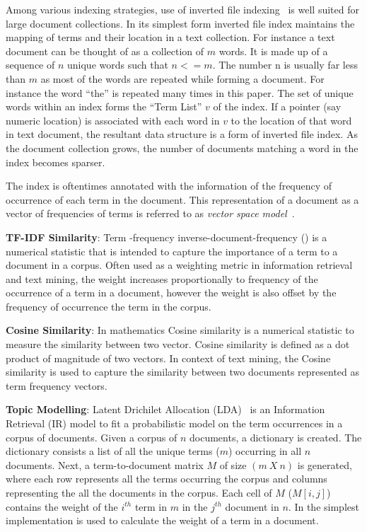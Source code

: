 Among various indexing strategies,
use of inverted file indexing~\cite{frakes1992introduction} is well suited for large
document collections. In its simplest form inverted file index maintains the
mapping of terms and their location in a text collection. For
instance a text document can be thought of as a collection
of $m$ words. It is made up of a sequence of $n$ unique words
such that $n <= m$. The number n is usually far less than
$m$ as most of the words are repeated while forming a document. 
For instance the word ``the'' is repeated many times in
this paper. The set of unique words within an index forms
the ``Term List'' $v$ of the index. If a pointer (say numeric
location) is associated with each word in $v$ to the location
of that word in text document, the resultant data structure
is a form of inverted file index. As the document collection
grows, the number of documents matching a word in the
index becomes sparser.

The index is oftentimes annotated with the information of the frequency of
occurrence of each term in the document. This representation of a document
as a vector of frequencies of terms is referred to as \textit{vector space model}~\cite{singhal2001modern,frakes1992introduction}.

\textbf{TF-IDF Similarity}\cite{manning2008introduction}: Term -frequency inverse-document-frequency () is a numerical statistic that is intended to capture the importance of a term to a document in a corpus.
Often used as a weighting metric in information retrieval and text mining,
the  weight increases proportionally to frequency of the occurrence of a term in a document, however the weight is also offset by the frequency of occurrence the term in the corpus.

\textbf{Cosine Similarity}\cite{singhal2001modern}: In mathematics Cosine similarity is a numerical statistic to measure the similarity between two vector.
Cosine similarity is defined as a dot product of magnitude of two vectors.
In context of text mining, the Cosine similarity is used to capture the similarity between two documents represented as term frequency vectors.

\textbf{Topic Modelling}: Latent Drichilet Allocation (LDA)~\cite{blei2003latent,panichella2013effectively} is an Information Retrieval (IR) 
model to fit a probabilistic model on the term occurrences in a corpus of documents.
Given a corpus of $n$ documents, a dictionary is created.
The dictionary consists a list of all the unique terms ($m$) occurring in all $n$ documents.
Next, a term-to-document matrix $M$ of size $(m\ X\ n)$ is generated, where each row represents all the terms occurring the corpus and columns representing the all the documents in the corpus.
Each cell of $M$ ($M[i,j]$) contains the weight of the $i^{th}$ term in $m$ in the $j^{th}$ document in $n$.
In the simplest implementation  is used to calculate the weight of a term in a document.


